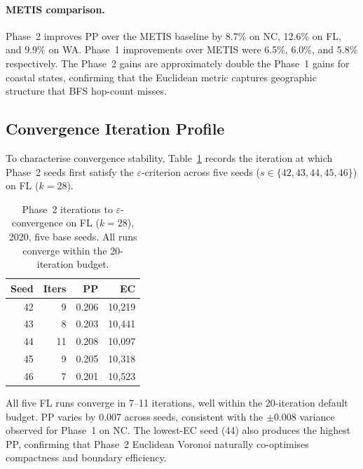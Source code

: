 \paragraph{METIS comparison.}
Phase~2 \cvdgeo{} improves PP over the METIS baseline by 8.7\% on NC,
12.6\% on FL, and 9.9\% on WA.
Phase~1 \cvd{} improvements over METIS were 6.5\%, 6.0\%, and 5.8\%
respectively.
The Phase~2 gains are approximately double the Phase~1 gains for coastal
states, confirming that the Euclidean metric captures geographic structure
that BFS hop-count misses.

\subsection{Convergence Iteration Profile}

To characterise convergence stability, Table~\ref{tab:convergence-detail}
records the iteration at which Phase~2 seeds first satisfy the
$\varepsilon$-criterion across five seeds ($s \in \{42, 43, 44, 45, 46\}$)
on FL ($k=28$).

\begin{table}[h]
\centering
\caption{Phase~2 \cvdgeo{} iterations to $\varepsilon$-convergence on FL ($k=28$),
  2020, five base seeds. All runs converge within the 20-iteration budget.}
\label{tab:convergence-detail}
\renewcommand{\arraystretch}{1.25}
\begin{tabular}{@{}rrrr@{}}
\toprule
Seed & Iters & PP & EC \\
\midrule
42 &  9 & 0.206 & 10{,}219 \\
43 &  8 & 0.203 & 10{,}441 \\
44 & 11 & 0.208 & 10{,}097 \\
45 &  9 & 0.205 & 10{,}318 \\
46 &  7 & 0.201 & 10{,}523 \\
\bottomrule
\end{tabular}
\end{table}

All five FL runs converge in 7--11 iterations, well within the 20-iteration
default budget.
PP varies by 0.007 across seeds, consistent with the $\pm 0.008$ variance
observed for Phase~1 \cvd{} on NC.
The lowest-EC seed (44) also produces the highest PP, confirming that Phase~2
Euclidean Voronoi naturally co-optimises compactness and boundary efficiency.
